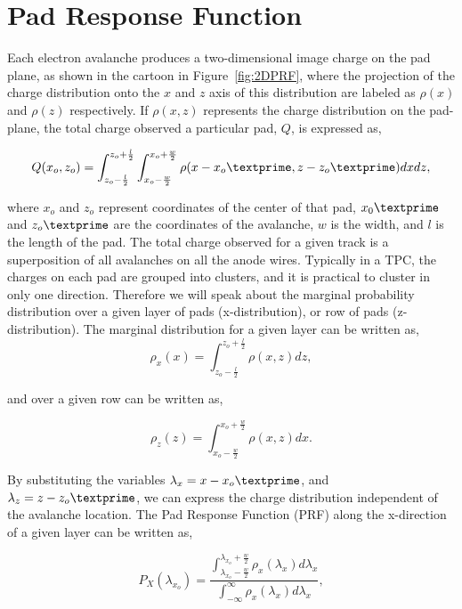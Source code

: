 
\section{Pad Response Function}
\label{sec:prf}
Each electron avalanche produces a two-dimensional image charge on the pad plane, as shown in the cartoon in Figure~\ref{fig:2DPRF}, where the projection of the charge distribution onto the $x$ and $z$ axis of this distribution are labeled as $\rho(x)$ and $\rho(z)$ respectively. If $\rho(x,z)$ represents the charge distribution on the pad-plane, the total charge observed a particular pad, $Q$, is expressed as,

\begin{equation}
Q(x_o,z_o) = \int_{z_o - \frac{l}{2}}^{z_o + \frac{l}{2}} \int_{x_o - \frac{w}{2}}^{x_o + \frac{w}{2}} \rho(x-x_o\textprime,z - z_o\textprime) dxdz,
\label{eq:prfpadCharge}
\end{equation}

where $x_o$ and $z_o$ represent coordinates of the center of that pad, $x_0\textprime$ and $z_o\textprime$ are the coordinates of the avalanche, $w$ is the width, and $l$ is the length of the pad. The total charge observed for a given track is a superposition of all avalanches on all the anode wires. Typically in a TPC, the charges on each pad are grouped into clusters, and it is practical to cluster in only one direction. Therefore we will speak about the marginal probability distribution over a given layer of pads (x-distribution), or row of pads (z-distribution). The marginal distribution for a given layer can be written as,
\begin{equation}
\rho_x(x) = \int_{z_o - \frac{l}{2}}^{z_o + \frac{l}{2}} \rho(x,z)dz,
\end{equation}

and over a given row can be written as,

\begin{equation}
\rho_z(z) = \int_{x_o - \frac{w}{2}}^{x_o + \frac{w}{2}} \rho(x,z)dx.
\end{equation}

By substituting the variables  $\lambda_x = x - x_o\textprime$, and $\lambda_z = z - z_o\textprime$, we can express the charge distribution independent of the avalanche location. The Pad Response Function (PRF) along the x-direction of a given layer can be written as,

\begin{equation}
P_X(\lambda_{x_o}) = \frac{ \int_{\lambda_{x_o}-\frac{w}{2}}^{\lambda_{x_o} + \frac{w}{2}} \rho_x(\lambda_x)d\lambda_x } {\int_{-\infty}^\infty \rho_x(\lambda_x)d\lambda_x     },
\label{eq:prflayer}
\end{equation}

